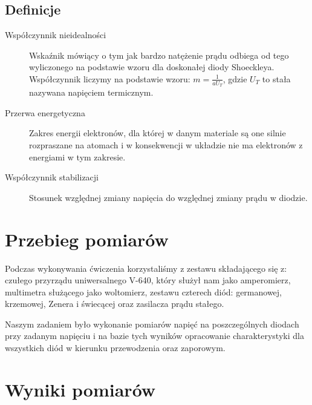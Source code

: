 \documentclass{article}
\begin{document}

\subsection{Definicje}
\label{definitions}
\begin{description}
\item[Współczynnik nieidealności]
Wskaźnik mówiący o tym jak bardzo natężenie prądu odbiega od tego wyliczonego na podstawie wzoru dla doskonałej diody Shoeckleya. Współczynnik liczymy na podstawie wzoru: $m = \frac{1}{aU_{T}}$, gdzie $U_{T}$ to stała nazywana napięciem termicznym.
\item[Przerwa energetyczna]
Zakres energii elektronów, dla której w danym materiale są one silnie rozpraszane na atomach i w konsekwencji w układzie nie ma elektronów z energiami w tym zakresie.
\item[Współczynnik stabilizacji]
Stosunek względnej zmiany napięcia do względnej zmiany prądu w diodzie.
\end{description} 

\section{Przebieg pomiarów}
Podczas wykonywania ćwiczenia korzystaliśmy z zestawu składającego się z: czułego przyrządu uniwersalnego V-640, który służył nam jako amperomierz, multimetra służącego jako woltomierz, zestawu czterech diód: germanowej, krzemowej, Zenera i świecącej oraz zasilacza prądu stałego.

Naszym zadaniem było wykonanie pomiarów napięć na poszczególnych diodach przy zadanym napięciu i na bazie tych wyników opracowanie charakterystyki dla wszystkich diód w kierunku przewodzenia oraz zaporowym.
 
\clearpage

\section{Wyniki pomiarów}
\end{document}
